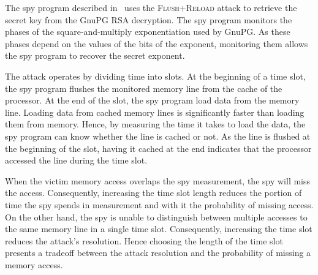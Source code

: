 \documentclass{llncs}
\begin{document}
The spy program described in~\cite{yarom13flush} uses the \textsc{Flush+Reload} attack to retrieve
the secret key from the GnuPG RSA decryption.
The spy program monitors the phases of the square-and-multiply exponentiation used by GnuPG.  
As these phases depend on the values of the bits of the exponent, monitoring them
allows the spy program to recover the secret exponent.

The attack operates by dividing time into slots.  
At the beginning of a time slot, the spy program flushes the monitored memory line from the cache of the processor.
At the end of the slot, the spy program load data from the memory line.
Loading data from cached memory lines is significantly faster than loading them from memory.
Hence, by measuring the time it takes to load the data, the spy program can know whether the line is cached or not.
As the line is flushed at the beginning of the slot, having it cached at the end indicates that the processor accessed
the line during the time slot.

When the victim memory access overlaps the spy measurement, the spy will miss the access.
Consequently, increasing the time slot length reduces the portion of time the spy spends in
measurement and with it the probability of missing access.
On the other hand, the spy is unable to distinguish between multiple accesses to the same memory line in 
a single time slot.
Consequently, increasing the time slot reduces the attack's resolution.
Hence choosing the length of the time slot presents a tradeoff between the attack resolution
and the probability of missing a memory access.
\end{document}
